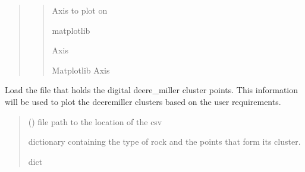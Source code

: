 \documentclass[letterpaper,10pt,english]{sphinxmanual}
\begin{document}
\begin{fulllineitems}
\begin{fulllineitems}
\begin{quote}
\begin{quote}
\begin{description}
\sphinxAtStartPar
Axis to plot on

\sphinxAtStartPar
matplotlib

\sphinxAtStartPar
Axis

\sphinxAtStartPar
Matplotlib Axis

\end{description}\end{quote}
\end{quote}

\end{fulllineitems}


\begin{fulllineitems}
\label{\detokenize{pyrockmodulus:pyrockmodulus.pyrockmodulus.modulus_ratio.load_data}}
\pysigstartsignatures
{}
\pysigstopsignatures
\sphinxAtStartPar
Load the file that holds the digital deere\_miller cluster points. This information will be used to plot the deere\sphinxhyphen{}miller clusters based on the user requirements.
\begin{quote}\begin{description}
\sphinxAtStartPar
{} () \textendash{} file path to the location of the csv

\sphinxAtStartPar
dictionary containing the type of rock and the points that form its cluster.

\sphinxAtStartPar
dict

\end{description}\end{quote}

\end{fulllineitems}



\end{fulllineitems}
\end{document}

